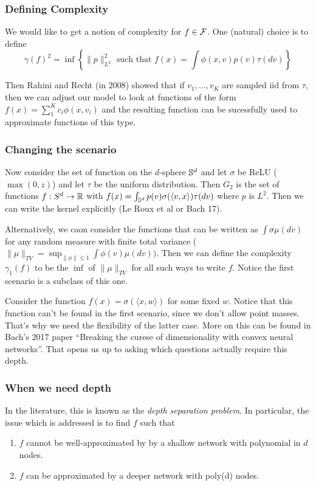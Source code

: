 \documentclass[12pt]{article}
\begin{document}
\subsubsection{Defining Complexity}
We would like to get a notion of complexity for $f\in \mathcal{F}$. One (natural) choice is to define 
\[\gamma(f)^2=\inf\left\{\|p\|^2_{L^2}\text{ such that } f(x)=\int \phi(x,v)p(v)\tau(dv)\right\}\]

Then Rahini and Recht (in 2008) showed that if $v_1,\dots,v_K$ are sampled iid from $\tau$, then we can adjust our model to look at functions of the form 
$f(x)=\sum_1^Kc_i\phi(x,v_i)$ and the resulting function can be sucessfully used to approximate functions of this type.

\subsubsection{Changing the scenario}
Now consider the set of function on the $d$-sphere $\mathbb{S}^d$ and let $\sigma$ be ReLU ($\max(0,z)$) and let $\tau$ be the uniform distribution. Then 
$G_2$ is the set of functions $f:S^d\to\mathbb{R}$ with $f(x)=\int_{\mathbb{S}^d}p(v)\sigma(\langle v,x\rangle)\tau(dv)$ where $p$ is $L^2$. Then we can write the kernel explicitly (Le Roux et al or Bach 17).

Alternatively, we caon consider the functions that can be written as $\int\sigma \mu(dv)$ for any random measure with finite total variance ($\|\mu\|_{TV}=\sup_{\|\phi\|\le 1}\int\phi(v)\mu(dv))$. Then we can define the complexity $\gamma_1(f)$ to be the $\inf$ of $\|\mu\|_{TV}$ for all such ways to write $f$.
Notice the first scenario is a subclass of this one.

Consider the function $f(x)=\sigma(\langle x,w\rangle)$ for some fixed $w$. Notice that this function can't be found in the first scenario, since we don't allow point masses. That's why we need the flexibility of the latter case. More on this can be found in Bach's 2017 paper ``Breaking the curese of dimensionality with convex neural networks''.
That opens us up to asking which questions actually require this depth.

\subsubsection{When we need depth}
In the literature, this is known as the \textit{depth separation problem}. In particular, the issue which is addressed is to find $f$ such that 
\begin{enumerate}
	\item $f$ cannot be well-approximated by by a shallow network with polynomial in $d$ nodes.
	\item $f$ can be approximated by a deeper network with poly(d) nodes.
\end{enumerate}
\end{document}
